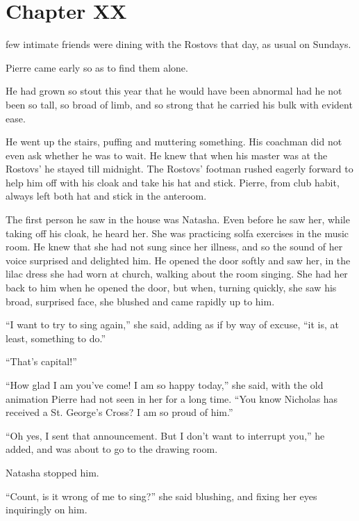\chapter*{Chapter XX}
\ifaudio     
{} 
\fi

 few intimate friends were dining with the Rostovs that day, as
usual on Sundays.

Pierre came early so as to find them alone.

He had grown so stout this year that he would have been abnormal
had he not been so tall, so broad of limb, and so strong that he
carried his bulk with evident ease.

He went up the stairs, puffing and muttering something. His
coachman did not even ask whether he was to wait. He knew that
when his master was at the Rostovs' he stayed till midnight. The
Rostovs' footman rushed eagerly forward to help him off with his
cloak and take his hat and stick. Pierre, from club habit, always
left both hat and stick in the anteroom.

The first person he saw in the house was Natasha. Even before he
saw her, while taking off his cloak, he heard her. She was
practicing solfa exercises in the music room. He knew that she
had not sung since her illness, and so the sound of her voice
surprised and delighted him. He opened the door softly and saw
her, in the lilac dress she had worn at church, walking about the
room singing. She had her back to him when he opened the door,
but when, turning quickly, she saw his broad, surprised face, she
blushed and came rapidly up to him.

``I want to try to sing again,'' she said, adding as if by way of
excuse, ``it is, at least, something to do.''

``That's capital!''

``How glad I am you've come! I am so happy today,'' she said,
with the old animation Pierre had not seen in her for a long
time. ``You know Nicholas has received a St. George's Cross? I am
so proud of him.''

``Oh yes, I sent that announcement. But I don't want to interrupt
you,'' he added, and was about to go to the drawing room.

Natasha stopped him.

``Count, is it wrong of me to sing?'' she said blushing, and
fixing her eyes inquiringly on him.

